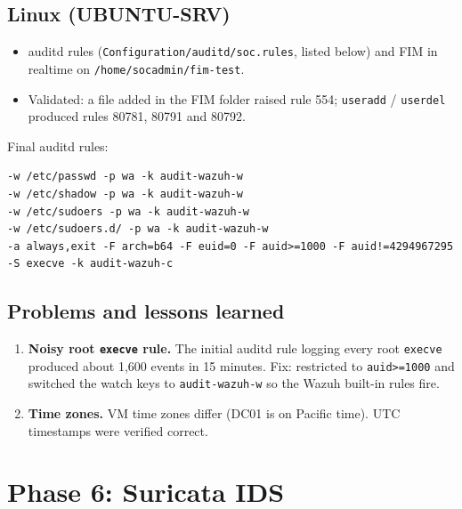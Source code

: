 \documentclass[11pt,a4paper]{article}
\begin{document}
\subsection{Linux (UBUNTU-SRV)}
\begin{itemize}
  \item auditd rules (\texttt{Configuration/\allowbreak auditd/\allowbreak soc.rules},
        listed below) and FIM in realtime on
        \texttt{/home/\allowbreak socadmin/\allowbreak fim-test}.
  \item Validated: a file added in the FIM folder raised rule 554;
        \texttt{useradd} / \texttt{userdel} produced rules 80781, 80791 and
        80792.
\end{itemize}

Final auditd rules:
\begin{lstlisting}
-w /etc/passwd -p wa -k audit-wazuh-w
-w /etc/shadow -p wa -k audit-wazuh-w
-w /etc/sudoers -p wa -k audit-wazuh-w
-w /etc/sudoers.d/ -p wa -k audit-wazuh-w
-a always,exit -F arch=b64 -F euid=0 -F auid>=1000 -F auid!=4294967295 -S execve -k audit-wazuh-c
\end{lstlisting}

\subsection{Problems and lessons learned}
\begin{enumerate}
  \item \textbf{Noisy root \texttt{execve} rule.} The initial auditd rule
        logging every root \texttt{execve} produced about 1,600 events in
        15 minutes. Fix: restricted to \texttt{auid>=1000} and switched the
        watch keys to \texttt{audit-wazuh-w} so the Wazuh built-in rules
        fire.
  \item \textbf{Time zones.} VM time zones differ (DC01 is on Pacific time).
        UTC timestamps were verified correct.
\end{enumerate}

\section{Phase 6: Suricata IDS}
\end{document}
